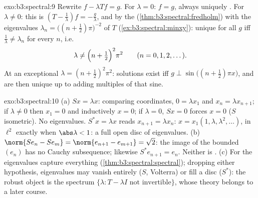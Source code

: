\begin{solution}{exo:b3:spectral:9}
Rewrite $f - \lambda Tf = g$. For $\lambda = 0$: $f = g$,
always uniquely . For $\lambda \neq 0$: this is
$(T - \frac1\lambda)f = -\frac g\lambda$, and by the  (\cref{thm:b3:spectral:fredholm}) with the
eigenvalues $\lambda_n = \bigl((n + \frac12)\pi\bigr)^{-2}$ of
$T$ (\cref{ex:b3:spectral:minxy}): unique  for all
$g$ iff $\frac1\lambda \neq \lambda_n$ for every $n$, i.e.
\[
\lambda \neq \Bigl(n + \tfrac12\Bigr)^2\pi^2
\qquad (n = 0, 1, 2, \dots).
\]
At an exceptional $\lambda = (n+\frac12)^2\pi^2$: solutions
exist iff $g \perp \sin\bigl((n{+}\frac12)\pi x\bigr)$, and
are then unique up to adding multiples of that sine.
\end{solution}

\begin{solution}{exo:b3:spectral:10}
(a) $Sx = \lambda x$: comparing coordinates, $0 = \lambda
x_1$ and $x_n = \lambda x_{n+1}$; if $\lambda \ne 0$ then
$x_1 = 0$ and inductively $x = 0$; if $\lambda = 0$, $Sx = 0$
forces $x = 0$ ($S$ isometric). No eigenvalues. $S^*x =
\lambda x$ reads $x_{n+1} = \lambda x_n$: $x =
x_1(1, \lambda, \lambda^2, \dots)$, in $\ell^2$ exactly when
$\abs\lambda < 1$: a full open disc of eigenvalues.
(b) $\norm{Se_n - Se_m} = \norm{e_{n+1} - e_{m+1}} = \sqrt2$:
the image of the bounded $(e_n)$ has no Cauchy subsequence;
likewise $S^*e_{n+1} = e_n$. Neither is .
(c) For   the eigenvalues
capture everything (\cref{thm:b3:spectral:spectral}); dropping
either hypothesis, eigenvalues may vanish entirely ($S$,
Volterra) or fill a disc ($S^*$): the robust object is the
spectrum $\{\lambda : T - \lambda I \text{ not invertible}\}$,
whose theory belongs to a later course.
\end{solution}

